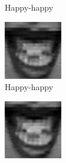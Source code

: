 \begin{figure}[H]
\begin{subfigure}[b]{0.15\textwidth}
		\caption{Happy-happy}
		\label{fig:timeseriesHappy:g}
	\end{subfigure}
	\begin{subfigure}[b]{0.15\textwidth}
		\includegraphics[width=\textwidth]{./img/timeseriesHappy/S026_006_00000008.png}
		\caption{Happy-happy}
		\label{fig:timeseriesHappy:h}
	\end{subfigure}
	\begin{subfigure}[b]{0.15\textwidth}
		\includegraphics[width=\textwidth]{./img/timeseriesHappy/S026_006_00000009.png}

\end{subfigure}
\end{figure}
